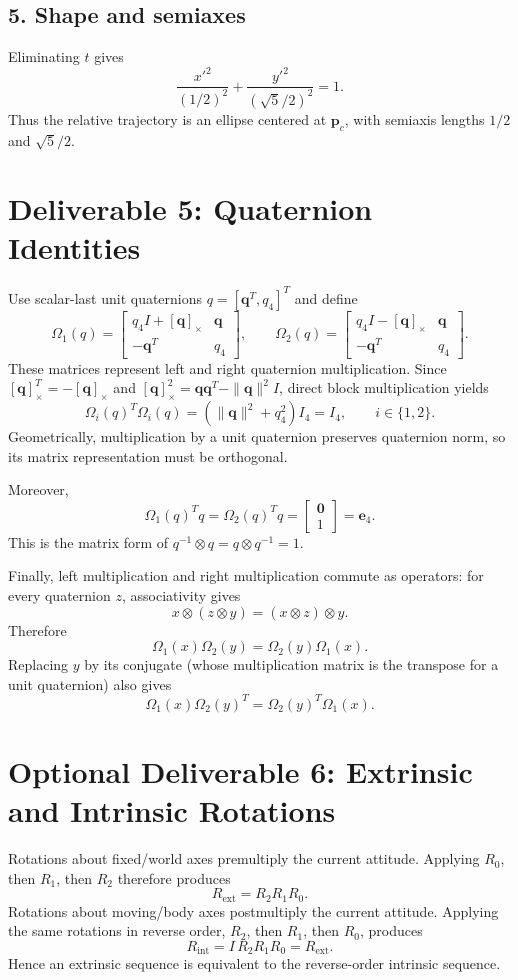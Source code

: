 \documentclass[11pt]{article}
\newcommand{\skew}[1]{[#1]_{\times}}
\begin{document}
\subsection*{5. Shape and semiaxes}
Eliminating \(t\) gives
\[
\frac{x'^2}{(1/2)^2}+\frac{y'^2}{(\sqrt5/2)^2}=1.
\]
Thus the relative trajectory is an ellipse centered at \(\bm{p}_c\), with
semiaxis lengths \(1/2\) and \(\sqrt5/2\).

\section*{Deliverable 5: Quaternion Identities}
Use scalar-last unit quaternions \(q=[\bm{q}^T,q_4]^T\) and define
\[
\Omega_1(q)=\begin{bmatrix}
q_4I+\skew{\bm q}&\bm q\\-\bm q^T&q_4
\end{bmatrix},\qquad
\Omega_2(q)=\begin{bmatrix}
q_4I-\skew{\bm q}&\bm q\\-\bm q^T&q_4
\end{bmatrix}.
\]
These matrices represent left and right quaternion multiplication. Since
\(\skew{\bm q}^T=-\skew{\bm q}\) and
\(\skew{\bm q}^2=\bm q\bm q^T-\|\bm q\|^2I\), direct block
multiplication yields
\[
\Omega_i(q)^T\Omega_i(q)
=(\|\bm q\|^2+q_4^2)I_4=I_4,\qquad i\in\{1,2\}.
\]
Geometrically, multiplication by a unit quaternion preserves quaternion norm,
so its matrix representation must be orthogonal.

Moreover,
\[
\Omega_1(q)^Tq=\Omega_2(q)^Tq=
\begin{bmatrix}\bm0\\1\end{bmatrix}=\bm e_4.
\]
This is the matrix form of \(q^{-1}\otimes q=q\otimes q^{-1}=1\).

Finally, left multiplication and right multiplication commute as operators:
for every quaternion \(z\), associativity gives
\[
x\otimes(z\otimes y)=(x\otimes z)\otimes y.
\]
Therefore
\[
\Omega_1(x)\Omega_2(y)=\Omega_2(y)\Omega_1(x).
\]
Replacing \(y\) by its conjugate (whose multiplication matrix is the
transpose for a unit quaternion) also gives
\[
\Omega_1(x)\Omega_2(y)^T=\Omega_2(y)^T\Omega_1(x).
\]

\section*{Optional Deliverable 6: Extrinsic and Intrinsic Rotations}
Rotations about fixed/world axes premultiply the current attitude. Applying
\(R_0\), then \(R_1\), then \(R_2\) therefore produces
\[
R_{\mathrm{ext}}=R_2R_1R_0.
\]
Rotations about moving/body axes postmultiply the current attitude. Applying
the same rotations in reverse order, \(R_2\), then \(R_1\), then \(R_0\),
produces
\[
R_{\mathrm{int}}=I\,R_2R_1R_0=R_{\mathrm{ext}}.
\]
Hence an extrinsic sequence is equivalent to the reverse-order intrinsic
sequence.
\end{document}
